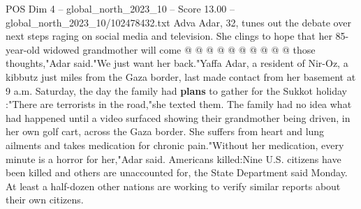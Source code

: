 \begin{textsample}{POS Dim 4 – global\_north\_2023\_10 – Score 13.00 – global\_north\_2023\_10/102478432.txt}
Adva Adar, 32, tunes out the debate over next steps raging on social media and television.
She clings to hope that her 85-year-old widowed grandmother will come @ @ @ @ @ @ @ @ @ @ those thoughts,"Adar said."We just want her back."Yaffa Adar, a resident of Nir-Oz, a kibbutz just miles from the Gaza border, last made contact from her basement at 9 a.m.
Saturday, the day the family had \textbf{plans} to gather for the Sukkot holiday :"There are terrorists in the road,"she texted them.
The family had no idea what had happened until a video surfaced showing their grandmother being driven, in her own golf cart, across the Gaza border.
She suffers from heart and lung ailments and takes medication for chronic pain."Without her medication, every minute is a horror for her,"Adar said.
Americans killed:Nine U.S. citizens have been killed and others are unaccounted for, the State Department said Monday.
At least a half-dozen other nations are working to verify similar reports about their own citizens.

\end{textsample}
